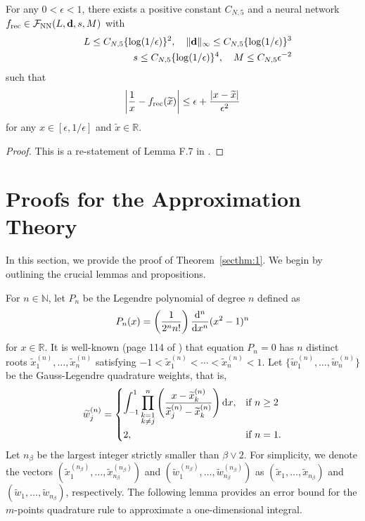 \documentclass[twoside,11pt]{article}
\def\cF{\mathcal F}
\newcommand{\bd}{{\bf d}}
\newcommand{\bbR}{{\mathbb R}}
\newcommand{\bbN}{{\mathbb N}}
\newcommand{\bean}{\setlength\arraycolsep{1pt}\begin{eqnarray*}}
\newcommand{\eean}{\end{eqnarray*}}
\def\d{{\rm d}}
\begin{document}
\begin{lemma}
\label{secnn:rec}
For any $0 < \epsilon < 1$, there exists a positive constant $C_{N,5}$ and a neural network $f_{\rm rec} \in \cF_{\rm NN}(L,\bd,s,M)$ with
\bean
&& L \leq C_{N,5} \{ \log(1/\epsilon)\}^{2}, \quad \|\bd\|_{\infty}\leq C_{N,5}  \{ \log(1/\epsilon)\}^{3}
\\
&& s  \leq C_{N,5}  \{ \log(1/\epsilon)\}^{4}, \quad M \leq C_{N,5} \epsilon^{-2}
\eean
such that
\bean
\left\vert \frac{1}{x} - f_{\rm rec}(\widetilde x) \right\vert \leq \epsilon + \frac{\vert x - \widetilde x \vert}{\epsilon^2}
\eean
for any $x \in [\epsilon,1/\epsilon]$ and $\widetilde x \in \bbR$.
\end{lemma}
\begin{proof}
This is a re-statement of Lemma F.7 in \citet{oko2023diffusion}.
\end{proof}



\section{Proofs for the Approximation Theory}
\label{secapp:approx}

In this section, we provide the proof of Theorem~\ref{secthm:1}.
We begin by outlining the crucial lemmas and propositions.

For $n \in \bbN$, let $P_{n}$ be the Legendre polynomial of degree $n$ defined as
\bean
  P_{n}(x) = \left( \frac{1}{2^{n}{n!}} \right) \frac{\d^{n}}{\d x^{n}} (x^2-1)^{n}
\eean
for $x \in \bbR$.
It is well-known (page 114 of \citet{arnold2004lectures}) that equation $P_{n}=0$ has $n$ distinct roots $\widetilde x_1^{(n)} ,\ldots,\widetilde x_{n}^{(n)}$ satisfying $-1< \widetilde x_1^{(n)} < \cdots < \widetilde x_{n}^{(n)} <1$.
Let $\{ \widetilde w_{1}^{(n)},\ldots, \widetilde w_{n}^{(n)} \}$ be the Gauss-Legendre quadrature weights, that is,
\bean
\widetilde w_j^{(n)} = \begin{dcases}
  \int_{-1}^{1} \prod_{\substack{k = 1 \\ k \neq j}}^{n} \left( \frac{x-\widetilde x_k^{(n)}}{\widetilde x_j^{(n)} - \widetilde x_k^{(n)}} \right) \d x, & \text{if }
       n \geq 2
  \\
  2, & \text{if } n=1.
  \end{dcases}
\eean
Let $n_{\beta}$ be the largest integer strictly smaller than $\beta \vee 2$.
For simplicity, we denote the vectors $(\widetilde x_1^{(n_\beta)} ,\ldots,\widetilde x_{n_\beta}^{(n_\beta)} )$ and $( \widetilde w_{1}^{(n_\beta)},\ldots, \widetilde w_{n_\beta}^{(n_\beta)} )$ as  $( \widetilde x_1 ,\ldots,\widetilde x_{n_\beta} )$ and $(\widetilde w_{1},\ldots, \widetilde w_{n_\beta} )$, respectively.
The following lemma provides an error bound for the $m$-points quadrature rule to approximate a one-dimensional integral.
\end{document}
